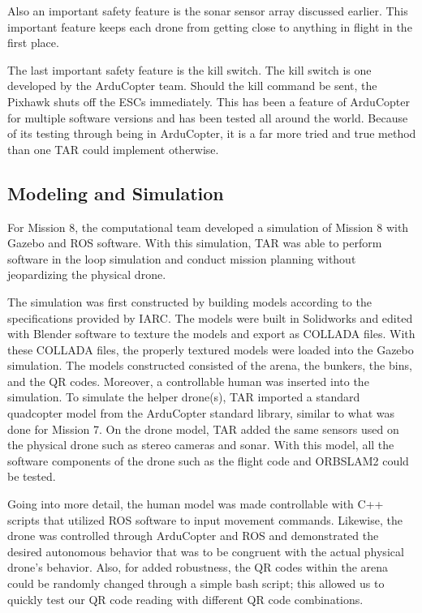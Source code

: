 \documentclass[12pt,letterpaper]{article}
\begin{document}
Also an important safety feature is the sonar sensor array discussed earlier. This important feature keeps each drone from getting close to anything in flight in the first place. 

The last important safety feature is the kill switch. The kill switch is one developed by the ArduCopter team. Should the kill command be sent, the Pixhawk shuts off the ESCs immediately. This has been a feature of ArduCopter for multiple software versions and has been tested all around the world. Because of its testing through being in ArduCopter, it is a far more tried and true method than one TAR could implement otherwise.


	\subsection*{Modeling and Simulation}
	For Mission 8, the computational team developed a simulation of Mission 8 with Gazebo and ROS software. With this simulation, TAR was able to perform software in the loop simulation and conduct mission planning without jeopardizing the physical drone.

	The simulation was first constructed by building models according to the specifications provided by IARC. The models were built in Solidworks and edited with Blender software to texture the models and export as COLLADA files. With these COLLADA files, the properly textured models were loaded into the Gazebo simulation. The models constructed consisted of the arena, the bunkers, the bins, and the QR codes. Moreover, a controllable human was inserted into the simulation. To simulate the helper drone(s), TAR imported a standard quadcopter model from the ArduCopter standard library, similar to what was done for Mission 7. On the drone model, TAR added the same sensors used on the physical drone such as stereo cameras and sonar. With this model, all the software components of the drone such as the flight code and ORBSLAM2 could be tested.
	
	Going into more detail, the human model was made controllable with C++ scripts that utilized ROS software to input movement commands. Likewise, the drone was controlled through ArduCopter and ROS and demonstrated the desired autonomous behavior that was to be congruent with the actual physical drone’s behavior. Also, for added robustness, the QR codes within the arena could be randomly changed through a simple bash script; this allowed us to quickly test our QR code reading with different QR code combinations.
	
\end{document}
